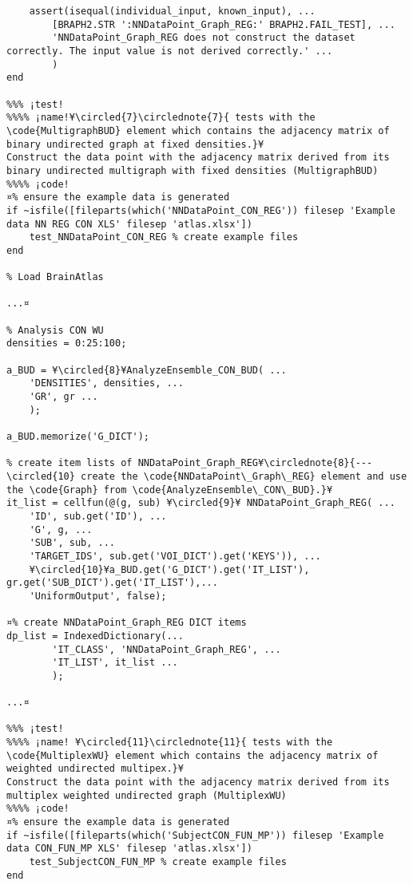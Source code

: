 \documentclass{tufte-handout}
\begin{document}
\begin{lstlisting}
    assert(isequal(individual_input, known_input), ...
        [BRAPH2.STR ':NNDataPoint_Graph_REG:' BRAPH2.FAIL_TEST], ...
        'NNDataPoint_Graph_REG does not construct the dataset correctly. The input value is not derived correctly.' ...
        )
end

%%% ¡test!
%%%% ¡name!¥\circled{7}\circlednote{7}{ tests with the \code{MultigraphBUD} element which contains the adjacency matrix of binary undirected graph at fixed densities.}¥
Construct the data point with the adjacency matrix derived from its binary undirected multigraph with fixed densities (MultigraphBUD)
%%%% ¡code!
¤% ensure the example data is generated
if ~isfile([fileparts(which('NNDataPoint_CON_REG')) filesep 'Example data NN REG CON XLS' filesep 'atlas.xlsx'])
    test_NNDataPoint_CON_REG % create example files
end

% Load BrainAtlas

...¤

% Analysis CON WU
densities = 0:25:100;

a_BUD = ¥\circled{8}¥AnalyzeEnsemble_CON_BUD( ...
    'DENSITIES', densities, ...
    'GR', gr ...
    );

a_BUD.memorize('G_DICT');

% create item lists of NNDataPoint_Graph_REG¥\circlednote{8}{---\circled{10} create the \code{NNDataPoint\_Graph\_REG} element and use the \code{Graph} from \code{AnalyzeEnsemble\_CON\_BUD}.}¥
it_list = cellfun(@(g, sub) ¥\circled{9}¥ NNDataPoint_Graph_REG( ...
    'ID', sub.get('ID'), ...
    'G', g, ...
    'SUB', sub, ...
    'TARGET_IDS', sub.get('VOI_DICT').get('KEYS')), ...
    ¥\circled{10}¥a_BUD.get('G_DICT').get('IT_LIST'), gr.get('SUB_DICT').get('IT_LIST'),...
    'UniformOutput', false);

¤% create NNDataPoint_Graph_REG DICT items
dp_list = IndexedDictionary(...
        'IT_CLASS', 'NNDataPoint_Graph_REG', ...
        'IT_LIST', it_list ...
        );

...¤

%%% ¡test!
%%%% ¡name! ¥\circled{11}\circlednote{11}{ tests with the \code{MultiplexWU} element which contains the adjacency matrix of weighted undirected multipex.}¥
Construct the data point with the adjacency matrix derived from its multiplex weighted undirected graph (MultiplexWU)
%%%% ¡code!
¤% ensure the example data is generated
if ~isfile([fileparts(which('SubjectCON_FUN_MP')) filesep 'Example data CON_FUN_MP XLS' filesep 'atlas.xlsx'])
    test_SubjectCON_FUN_MP % create example files
end


\end{lstlisting}
\end{document}

